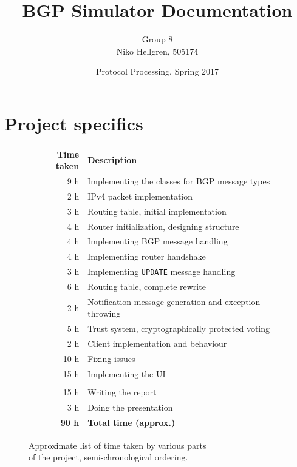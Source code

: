 \documentclass[11pt,a4paper,titlepage]{report}
\author{Group 8\\Niko Hellgren, 505174}
\title{BGP Simulator Documentation}
\date{Protocol Processing, Spring 2017}
\begin{document}
\maketitle
\tableofcontents
\pagebreak

\section{Project specifics}\label{sec:project}
\begin{figure}
\begin{center}
\begin{tabular}{r l}
\textbf{Time taken} & \textbf{Description}\\
9 h & Implementing the classes for BGP message types \\
2 h & IPv4 packet implementation \\
3 h & Routing table, initial implementation \\
4 h & Router initialization, designing structure \\
4 h & Implementing BGP message handling \\
4 h & Implementing router handshake \\
3 h & Implementing \texttt{UPDATE} message handling \\
6 h & Routing table, complete rewrite \\
2 h & Notification message generation and exception throwing \\
5 h & Trust system, cryptographically protected voting \\
2 h & Client implementation and behaviour \\
10 h & Fixing issues \\
15 h & Implementing the UI \\
\vspace{1mm} \\
15 h & Writing the report \\
3 h & Doing the presentation \\
\hline
\textbf{90 h} & \textbf{Total time (approx.)}
\end{tabular}
\end{center}
\caption{Approximate list of time taken by various parts\\of the project, semi-chronological ordering.}
\label{fig:timetaken}
\end{figure}
\end{document}
